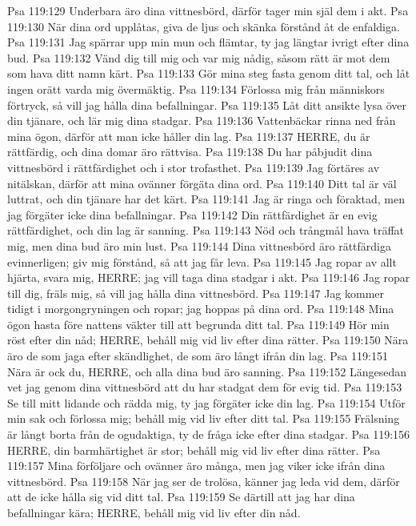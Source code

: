 Psa 119:129  Underbara äro dina vittnesbörd, därför tager min själ dem i akt.
Psa 119:130  När dina ord upplåtas, giva de ljus och skänka förstånd åt de enfaldiga.
Psa 119:131  Jag spärrar upp min mun och flämtar, ty jag längtar ivrigt efter dina bud.
Psa 119:132  Vänd dig till mig och var mig nådig, såsom rätt är mot dem som hava ditt namn kärt.
Psa 119:133  Gör mina steg fasta genom ditt tal, och låt ingen orätt varda mig övermäktig.
Psa 119:134  Förlossa mig från människors förtryck, så vill jag hålla dina befallningar.
Psa 119:135  Låt ditt ansikte lysa över din tjänare, och lär mig dina stadgar.
Psa 119:136  Vattenbäckar rinna ned från mina ögon, därför att man icke håller din lag.
Psa 119:137  HERRE, du är rättfärdig, och dina domar äro rättvisa.
Psa 119:138  Du har påbjudit dina vittnesbörd i rättfärdighet och i stor trofasthet.
Psa 119:139  Jag förtäres av nitälskan, därför att mina ovänner förgäta dina ord.
Psa 119:140  Ditt tal är väl luttrat, och din tjänare har det kärt.
Psa 119:141  Jag är ringa och föraktad, men jag förgäter icke dina befallningar.
Psa 119:142  Din rättfärdighet är en evig rättfärdighet, och din lag är sanning.
Psa 119:143  Nöd och trångmål hava träffat mig, men dina bud äro min lust.
Psa 119:144  Dina vittnesbörd äro rättfärdiga evinnerligen; giv mig förstånd, så att jag får leva.
Psa 119:145  Jag ropar av allt hjärta, svara mig, HERRE; jag vill taga dina stadgar i akt.
Psa 119:146  Jag ropar till dig, fräls mig, så vill jag hålla dina vittnesbörd.
Psa 119:147  Jag kommer tidigt i morgongryningen och ropar; jag hoppas på dina ord.
Psa 119:148  Mina ögon hasta före nattens väkter till att begrunda ditt tal.
Psa 119:149  Hör min röst efter din nåd; HERRE, behåll mig vid liv efter dina rätter.
Psa 119:150  Nära äro de som jaga efter skändlighet, de som äro långt ifrån din lag.
Psa 119:151  Nära är ock du, HERRE, och alla dina bud äro sanning.
Psa 119:152  Längesedan vet jag genom dina vittnesbörd att du har stadgat dem för evig tid.
Psa 119:153  Se till mitt lidande och rädda mig, ty jag förgäter icke din lag.
Psa 119:154  Utför min sak och förlossa mig; behåll mig vid liv efter ditt tal.
Psa 119:155  Frälsning är långt borta från de ogudaktiga, ty de fråga icke efter dina stadgar.
Psa 119:156  HERRE, din barmhärtighet är stor; behåll mig vid liv efter dina rätter.
Psa 119:157  Mina förföljare och ovänner äro många, men jag viker icke ifrån dina vittnesbörd.
Psa 119:158  När jag ser de trolösa, känner jag leda vid dem, därför att de icke hålla sig vid ditt tal.
Psa 119:159  Se därtill att jag har dina befallningar kära; HERRE, behåll mig vid liv efter din nåd.
